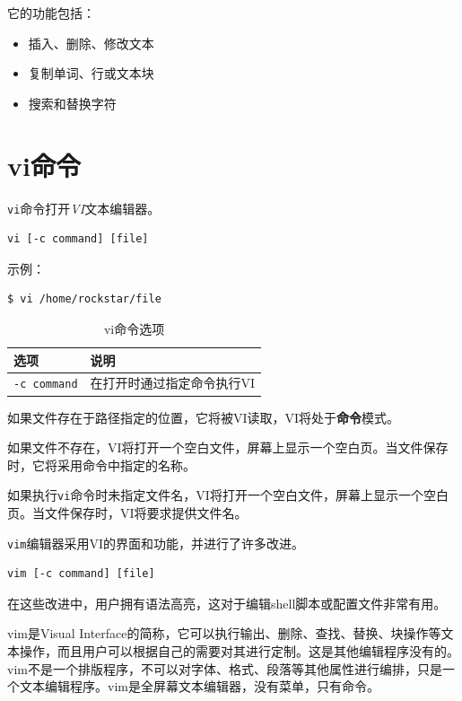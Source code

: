 \documentclass[12pt,a4paper,twoside]{ctexbook}
\begin{document}
它的功能包括：

\begin{itemize}
    \item 插入、删除、修改文本
    \item 复制单词、行或文本块
    \item 搜索和替换字符
\end{itemize}

\section{vi命令}

\texttt{vi}命令打开\textit{VI}文本编辑器。

\begin{verbatim}
vi [-c command] [file]
\end{verbatim}

示例：

\begin{verbatim}
$ vi /home/rockstar/file
\end{verbatim}

\begin{table}[H]
    \centering
    \caption{vi命令选项}
    \begin{tabular}{ll}
        \toprule
        \textbf{选项} & \textbf{说明} \\
        \midrule
        \texttt{-c command} & 在打开时通过指定命令执行VI \\
        \bottomrule
    \end{tabular}
\end{table}

如果文件存在于路径指定的位置，它将被VI读取，VI将处于\textbf{命令}模式。

如果文件不存在，VI将打开一个空白文件，屏幕上显示一个空白页。当文件保存时，它将采用命令中指定的名称。

如果执行\texttt{vi}命令时未指定文件名，VI将打开一个空白文件，屏幕上显示一个空白页。当文件保存时，VI将要求提供文件名。

\texttt{vim}编辑器采用VI的界面和功能，并进行了许多改进。

\begin{verbatim}
vim [-c command] [file]
\end{verbatim}

在这些改进中，用户拥有语法高亮，这对于编辑shell脚本或配置文件非常有用。

vim是Visual Interface的简称，它可以执行输出、删除、查找、替换、块操作等文本操作，而且用户可以根据自己的需要对其进行定制。这是其他编辑程序没有的。vim不是一个排版程序，不可以对字体、格式、段落等其他属性进行编排，只是一个文本编辑程序。vim是全屏幕文本编辑器，没有菜单，只有命令。
\end{document}
